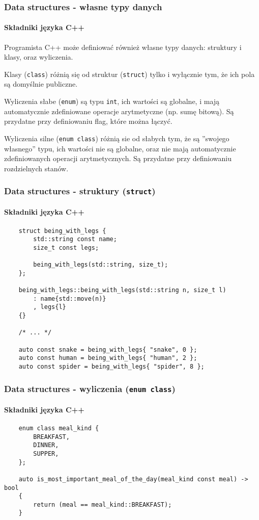 \documentclass[aspectratio=169]{beamer}
\begin{document}
\begin{frame}
    \frametitle{Data structures - własne typy danych}
    \framesubtitle{Składniki języka C++}

    Programista C++ może definiować również własne typy danych: struktury i
    klasy, oraz wyliczenia.

    \vspace{1em}

    Klasy ({\tt class}) różnią się od struktur ({\tt struct}) tylko i wyłącznie
    tym, że ich pola są domyślnie publiczne.

    \vspace{1em}

    Wyliczenia słabe ({\tt enum}) są typu {\tt int}, ich wartości są globalne, i
    mają automatycznie zdefiniowane operacje arytmetyczne (np. sumę bitową). Są
    przydatne przy definiowaniu flag, które można łączyć.

    Wyliczenia silne ({\tt enum class}) różnią sie od słabych tym, że są
    ''swojego własnego'' typu, ich wartości nie są globalne, oraz nie mają
    automatycznie zdefiniowanych operacji arytmetycznych. Są przydatne przy
    definiowaniu rozdzielnych stanów.
\end{frame}

\begin{frame}[fragile]
    \frametitle{Data structures - struktury ({\tt struct})}
    \framesubtitle{Składniki języka C++}

    {\scriptsize
    \begin{lstlisting}
    struct being_with_legs {
        std::string const name;
        size_t const legs;

        being_with_legs(std::string, size_t);
    };

    being_with_legs::being_with_legs(std::string n, size_t l)
        : name{std::move(n)}
        , legs{l}
    {}

    /* ... */

    auto const snake = being_with_legs{ "snake", 0 };
    auto const human = being_with_legs{ "human", 2 };
    auto const spider = being_with_legs{ "spider", 8 };
    \end{lstlisting}}
\end{frame}

\begin{frame}[fragile]
    \frametitle{Data structures - wyliczenia ({\tt enum class})}
    \framesubtitle{Składniki języka C++}

    {\scriptsize
    \begin{lstlisting}
    enum class meal_kind {
        BREAKFAST,
        DINNER,
        SUPPER,
    };

    auto is_most_important_meal_of_the_day(meal_kind const meal) -> bool
    {
        return (meal == meal_kind::BREAKFAST);
    }
    \end{lstlisting}}
\end{frame}
\end{document}
